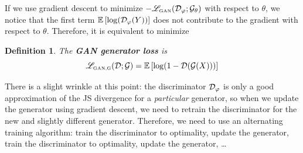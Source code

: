 \documentclass{article}
\newtheorem{defn}{Definition}
\begin{document}
	If we use gradient descent to minimize \(-\mathscr{L}_{\textnormal{\tiny GAN}}(\mathcal{D}_\varphi; \mathcal{G}_\theta)\) with respect to \(\theta\), we notice that the first term \(\mathbb{E}\left[\log(\mathcal{D}_\varphi(Y))\right]\) does not contribute to the gradient with respect to \(\theta\). Therefore, it is equivalent to minimize
	\newcommand{\lossgangenerator}{\mathscr{L}_{\textnormal{\tiny GAN,G}}}
	\begin{defn}\label{def:gan_generator_loss}
		The \textbf{GAN generator loss} is
		\begin{equation}\label{eq:gan_generator_loss}
			\lossgangenerator(\discriminator; \generator) = \expect\left[\log(1-\discriminator(\generator(X)))\right]
		\end{equation}
	\end{defn}
	
	There is a slight wrinkle at this point: the discriminator \(\mathcal{D}_\varphi\) is only a good approximation of the JS divergence for a \textit{particular} generator, so when we update the generator using gradient descent, we need to retrain the discriminator for the new and slightly different generator. Therefore, we need to use an alternating training algorithm: train the discriminator to optimality, update the generator, train the discriminator to optimality, update the generator, \dots
	
\end{document}
